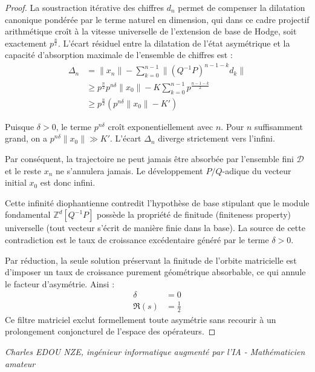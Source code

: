 \documentclass[
]{article}
\begin{document}
\begin{proof}
La soustraction itérative des chiffres $d_n$ permet de compenser la dilatation canonique pondérée par le terme naturel en dimension, qui dans ce cadre projectif arithmétique croît à la vitesse universelle de l'extension de base de Hodge, soit exactement $p^{\frac{n}{2}}$.
L'écart résiduel entre la dilatation de l'état asymétrique et la capacité d'absorption maximale de l'ensemble de chiffres est :
\begin{align*}
    \Delta_n &= \|x_n\| - \sum_{k=0}^{n-1} \|(Q^{-1}P)^{n-1-k} d_k\| \\
    &\ge p^{\frac{n}{2}} p^{n\delta} \|x_0\| - K \sum_{k=0}^{n-1} p^{\frac{n-1-k}{2}} \\
    &\ge p^{\frac{n}{2}} \left( p^{n\delta} \|x_0\| - K' \right)
\end{align*}

Puisque $\delta > 0$, le terme $p^{n\delta}$ croît exponentiellement avec $n$. Pour $n$ suffisamment grand, on a $p^{n\delta} \|x_0\| \gg K'$. L'écart $\Delta_n$ diverge strictement vers l'infini.

Par conséquent, la trajectoire ne peut jamais être absorbée par l'ensemble fini $\mathcal{D}$ et le reste $x_n$ ne s'annulera jamais. Le développement $P/Q$-adique du vecteur initial $x_0$ est donc infini.

Cette infinité diophantienne contredit l'hypothèse de base stipulant que le module fondamental $\mathbb{Z}^d[Q^{-1}P]$ possède la propriété de finitude (finiteness property) universelle (tout vecteur s'écrit de manière finie dans la base). La source de cette contradiction est le taux de croissance excédentaire généré par le terme $\delta > 0$.

Par réduction, la seule solution préservant la finitude de l'orbite matricielle est d'imposer un taux de croissance purement géométrique absorbable, ce qui annule le facteur d'asymétrie. Ainsi :
\begin{align*}
    \delta &= 0 \\
    \Re(s) &= \frac{1}{2}
\end{align*}
Ce filtre matriciel exclut formellement toute asymétrie sans recourir à un prolongement conjoncturel de l'espace des opérateurs.
\end{proof}

\vspace{1cm}
\begin{flushright}
\textit{Charles EDOU NZE, ingénieur informatique augmenté par l'IA - Mathématicien amateur}
\end{flushright}
\end{document}
